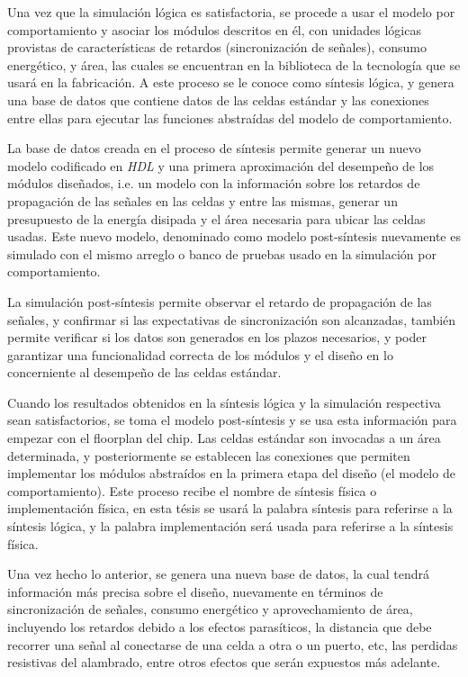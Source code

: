 {Una vez que la simulación lógica es satisfactoria, se procede a usar el modelo por comportamiento y asociar los módulos descritos en él, con unidades lógicas provistas de características de retardos (sincronización de señales), consumo energético, y área, las cuales se encuentran en la biblioteca de la tecnología que se usará en la fabricación. A este proceso se le conoce como síntesis lógica, y genera una base de datos que contiene datos de las celdas estándar y las conexiones entre ellas para ejecutar las funciones abstraídas del modelo de comportamiento.

La base de datos creada en el proceso de síntesis permite generar un nuevo modelo codificado en \textit{HDL} y una primera aproximación del desempeño de los módulos diseñados, i.e. un modelo con la información sobre los retardos de propagación de las señales en las celdas y entre las mismas, generar un presupuesto de la energía disipada y el área necesaria para ubicar las celdas usadas. Este nuevo modelo, denominado como modelo post-síntesis nuevamente es simulado con el mismo arreglo o banco de pruebas usado en la simulación por comportamiento.

La simulación post-síntesis permite observar el retardo de propagación de las señales, y confirmar si las expectativas de sincronización son alcanzadas, también permite verificar si los datos son generados en los plazos necesarios, y poder garantizar una funcionalidad correcta de los módulos y el diseño en lo concerniente al desempeño de las celdas estándar. 

Cuando los resultados obtenidos en la síntesis lógica y la simulación respectiva sean satisfactorios, se toma el modelo post-síntesis y se usa esta información para empezar con el floorplan del chip. Las celdas estándar son invocadas a un área determinada, y posteriormente se establecen las conexiones que permiten implementar los módulos abstraídos en la primera etapa del diseño (el modelo de comportamiento). Este proceso recibe el nombre de síntesis física o implementación física, en esta tésis se usará la palabra síntesis para referirse a la síntesis lógica, y la palabra implementación será usada para referirse a la síntesis física.

Una vez hecho lo anterior, se genera una nueva base de datos, la cual tendrá información más precisa sobre el diseño, nuevamente en términos de sincronización de señales, consumo energético y aprovechamiento de área, incluyendo los retardos debido a los efectos parasíticos, la distancia que debe recorrer una señal al conectarse de una celda a otra o un puerto, etc, las perdidas resistivas del alambrado, entre otros efectos que serán expuestos más adelante.

}
